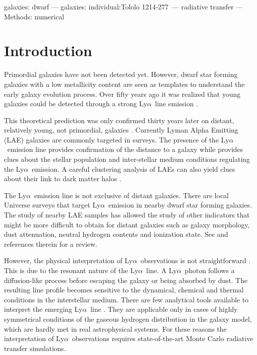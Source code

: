 \documentclass[a4,useAMS,usenatbib,usegraphicx]{mn2e}
\newcommand{\tol}{Tololo 1214-277}
\newcommand{\lya}{Ly$\alpha$}
\begin{document}
\begin{keywords}
galaxies: dwarf --- galaxies: individual:\tol\ --- radiative transfer --- Methods: numerical 
\end{keywords}



\section{Introduction}
\label{sec:introduction}

Primordial galaxies have not been detected yet. 
However, dwarf star forming galaxies with a low metallicity content
are seen as templates to understand the early galaxy evolution process. 
Over fifty years ago it was realized that young galaxies could be
detected through a strong \lya\ line emission \citep{PartridgePeebles}.    

This theoretical prediction was only confirmed thirty years later on
distant, relatively young, not primordial, galaxies \citep{1998ApJ...498L..93D}.
Currently Lyman Alpha Emitting (LAE) galaxies are commonly targeted
in surveys. 
The presence of the \lya\ emission line provides confirmation of
the distance to a galaxy while provides clues about the stellar
population and inter-stellar medium conditions regulating the
\lya\ emission.
A careful clustering analysis of LAEs can also yield clues about their link
to dark matter halos
\citep{2004AJ....128.2073H,2007ApJ...671..278G,2007ApJ...668...15K,2008MNRAS.391.1589O,2010MNRAS.409..184P,2013MNRAS.431.1777G,2016ApJ...828....5M}. 

The \lya\ emission line is not exclusive of distant galaxies. 
There are local Universe surveys that target \lya\ emission in nearby
dwarf star forming galaxies.
The study of nearby LAE samples has allowed the study of other
indicators that might be more difficult to obtain for distant galaxies
such as galaxy morphology, dust attenuation, neutral hydrogen contents and
ionization state. See \cite{Hayes15} and references therein for a review.

However, the physical interpretation of \lya\ observations is
not straightforward \citep{LARS,2015ApJ...805...14R}. 
This is due to the resonant nature of the \lya\ line. 
A \lya\ photon follows a diffusion-like process before escaping
the galaxy or being absorbed by dust. 
The resulting line profile becomes sensitive to the dynamical, chemical
and thermal conditions in the interstellar medium. 
There are few analytical tools available to interpret the
emerging \lya\ line
\citep{Harrington73,1991ApJ...370L..85N,LoebRybicki,2006ApJ...645..792T}. 
They are applicable only in cases of highly symmetrical
conditions of the gaseous hydrogen distribution in the galaxy model,
which are hardly met in real astrophysical systems. 
For these reasons the interpretation of \lya\ observations
requires state-of-the-art Monte Carlo radiative transfer simulations.   
\end{document}
